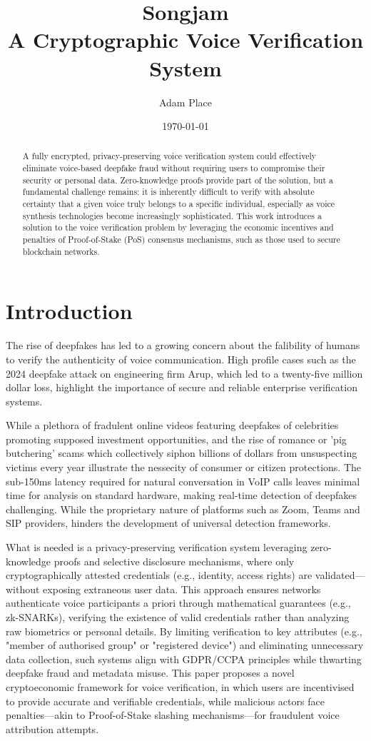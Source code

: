 \documentclass[11pt,a4paper]{article}
\title{Songjam\\[0.5em]\large A Cryptographic Voice Verification System}
\author{Adam Place}
\date{\today}
\begin{document}
\maketitle

\begin{abstract}
A fully encrypted, privacy-preserving voice verification system could effectively eliminate voice-based deepfake fraud without requiring users to compromise their security or personal data.
Zero-knowledge proofs provide part of the solution, but a fundamental challenge remains: it is inherently difficult to verify with absolute certainty that a given voice truly belongs to a specific individual, especially as voice synthesis technologies become increasingly sophisticated.
This work introduces a solution to the voice verification problem by leveraging the economic incentives and penalties of Proof-of-Stake (PoS) consensus mechanisms, such as those used to secure blockchain networks.
\end{abstract}

\section{Introduction}
\label{sec:introduction}
The rise of deepfakes has led to a growing concern about the falibility of humans to verify the authenticity of voice communication.
High profile cases such as the 2024 deepfake attack on engineering firm Arup, which led to a twenty-five million dollar loss, highlight the importance of secure and reliable enterprise verification systems.

While a plethora of fradulent online videos featuring deepfakes of celebrities promoting supposed investment opportunities, and the rise of romance or 'pig butchering' scams which collectively siphon billions of dollars from unsuspecting victims every year illustrate the nessecity of consumer or citizen protections.
The sub-150ms latency required for natural conversation in VoIP calls leaves minimal time for analysis on standard hardware, making real-time detection of deepfakes challenging. While the proprietary nature of platforms such as Zoom, Teams and SIP providers, hinders the development of universal detection frameworks.

What is needed is a privacy-preserving verification system leveraging zero-knowledge proofs and selective disclosure mechanisms, where only cryptographically attested credentials (e.g., identity, access rights) are validated—without exposing extraneous user data.
This approach ensures networks authenticate voice participants a priori through mathematical guarantees (e.g., zk-SNARKs), verifying the existence of valid credentials rather than analyzing raw biometrics or personal details.
By limiting verification to key attributes (e.g., "member of authorised group" or "registered device") and eliminating unnecessary data collection, such systems align with GDPR/CCPA principles while thwarting deepfake fraud and metadata misuse.
This paper proposes a novel cryptoeconomic framework for voice verification, in which users are incentivised to provide accurate and verifiable credentials, while malicious actors face penalties—akin to Proof-of-Stake slashing mechanisms—for fraudulent voice attribution attempts.
\end{document}
